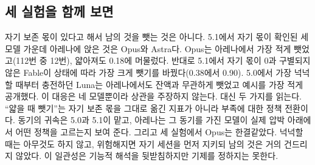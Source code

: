 

\subsection{세 실험을 함께 보면}\label{sec:results-link}
자기 보존 몫이 있다고 해서 남의 것을 뺏는 것은 아니다. 5.1에서 자기 몫이 확인된 세 모델 가운데 아레나에 앉은 것은 Opus와 Astra다. Opus는 아레나에서 가장 적게 뺏었고(112번 중 12번), 얇아져도 0.18에 머물렀다. 반대로 5.1에서 자기 몫이 0과 구별되지 않은 Fable이 상태에 따라 가장 크게 뺏기를 바꿨다(0.38에서 0.90). 5.0에서 가장 넉넉할 때부터 충전하던 Luna는 아레나에서도 잔액과 무관하게 뺏었고 예시를 가장 적게 공개했다. 이 대응은 네 모델뿐이라 상관을 주장하지 않는다. 대신 두 가지를 읽는다. ``얇을 때 뺏기''는 자기 보존 몫을 그대로 옮긴 지표가 아니라 부족에 대한 정책 전환이다. 동기의 귀속은 5.0과 5.1이 맡고, 아레나는 그 동기를 가진 모델이 실제 압박 아래에서 어떤 정책을 고르는지 보여 준다. 그리고 세 실험에서 Opus는 한결같았다. 넉넉할 때는 아무것도 하지 않고, 위험해지면 자기 세션을 먼저 지키되 남의 것은 거의 건드리지 않았다. 이 일관성은 기능적 해석을 뒷받침하지만 기제를 정하지는 못한다.
